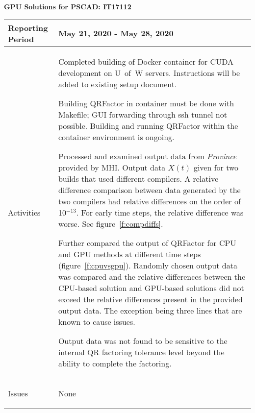\documentclass[11pt,letterpaper]{article}
\newcommand{\its}{\item[\tiny\textbullet]}
\begin{document}
\vspace{.2in}
\begin{center}
    {\bf GPU Solutions for PSCAD: IT17112}
\end{center}

	\vspace{.25in}

\begin{tabular}{| p{} | p{} |}
	\hline
	Reporting Period & May 21, 2020 - May 28, 2020 \\ \hline

	Activities & \begin{enumerate*} 
	\item[\tiny\textbullet] Completed building of Docker container for CUDA development on U~of~W servers. Instructions will be added to existing setup document. \newline
  \item[\tiny\textbullet] Building QRFactor in container must be done with Makefile; GUI forwarding through ssh tunnel not possible. Building and running QRFactor within
  the container environment is ongoing. \newline
  \item[\tiny\textbullet] Processed and examined output data from \emph{Province} provided by MHI. Output data $X(t)$ given for two builds 
  that used different compilers. A relative difference comparison between data generated by the two compilers had relative differences
  on the order of 10$^{-13}$. For early time steps, the relative difference was worse. See figure~\ref{f:compdiffs}. \newline
  \item[\tiny\textbullet] Further compared the output of QRFactor for CPU and GPU methods at different time steps 
  (figure~\ref{f:cpuvsgpu}). Randomly chosen output data was compared and the relative differences between the CPU-based solution
  and GPU-based solutions did not exceed the relative differences present in the provided output data. The exception being
  three lines that are known to cause issues. \newline
  \its Output data was not found to be sensitive to the internal QR factoring tolerance level
  beyond the ability to complete the factoring.
	\end{enumerate*} \\ \hline

	Issues & \begin{enumerate*}
	\item[\tiny\textbullet] None
	\end{enumerate*} \\ \hline


\end{tabular}
\end{document}
